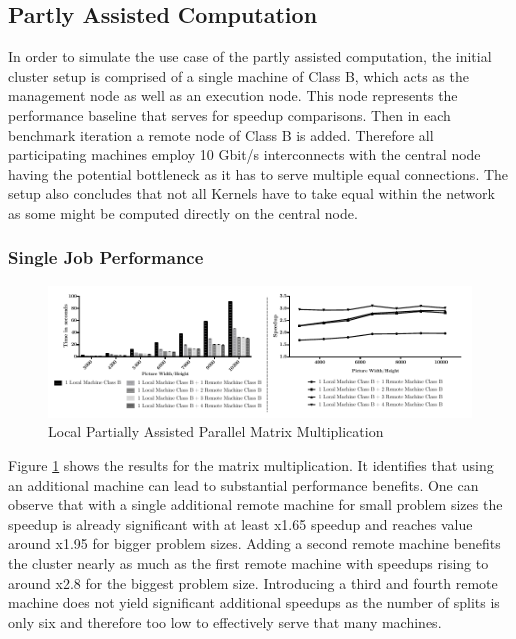 \subsection{Partly Assisted Computation}

In order to simulate the use case of the partly assisted computation, the initial cluster setup is comprised of a single machine of Class B, which acts as the management node as well as an execution node. This node represents the performance baseline that serves for speedup comparisons. Then in each benchmark iteration a remote node of Class B is added. Therefore all participating machines employ 10 Gbit/s interconnects with the central node having the potential bottleneck as it has to serve multiple equal connections. The setup also concludes that not all Kernels have to take equal within the network as some might be computed directly on the central node.

\subsubsection*{Single Job Performance}
\label{single_job_performance}

\begin{figure}[H]
	
	\includegraphics[width=1.0\textwidth]{images/local_partially_assisted_matrix.pdf}
	\centering
	\caption{Local Partially Assisted Parallel Matrix Multiplication}
	\label{img:parallel_matrix}
\end{figure}

Figure \ref{img:parallel_matrix} shows the results for the matrix multiplication. It identifies that using an additional machine can lead to substantial performance benefits. One can observe that with a single additional remote machine for small problem sizes the speedup is already significant with at least x1.65 speedup and reaches value around x1.95 for bigger problem sizes. Adding a second remote machine benefits the cluster nearly as much as the first remote machine with speedups rising to around x2.8 for the biggest problem size. Introducing a third and fourth remote machine does not yield significant additional speedups as the number of splits is only six and therefore too low to effectively serve that many machines.


